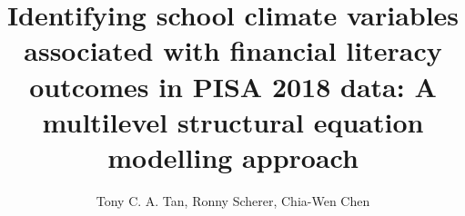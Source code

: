 \documentclass[review]{elsarticle}
\begin{document}
\begin{frontmatter}

\title{Identifying school climate variables associated with financial literacy outcomes in PISA 2018 data: A multilevel structural equation modelling approach}

\author{Tony C. A. Tan, Ronny Scherer, Chia-Wen Chen}
\address{Centre for Educational Measurement, University of Oslo}





\end{frontmatter}
\end{document}
